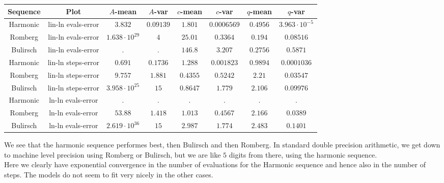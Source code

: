 \begin{table}[H]
    \centering
        \small
    \begin{tabular}{c|c||c|c|c|c|c	|c}
Sequence & Plot & \(A\)-mean & \(A\)-var & \(c\)-mean & \(c\)-var & \(q\)-mean & \(q\)-var\\\hline
Harmonic & lin-ln evals-error & \(3.832\) & \(0.09139\) & \(1.801\) & \(0.0006569\) & \(0.4956\) & \(3.963\cdot 10^{-5}\) \\
Romberg & lin-ln evals-error & \(1.638\cdot 10^{29}\) & \(4\) & \(25.01\) & \(0.3364\) & \(0.194\) & \(0.08516\) \\
Bulirsch & lin-ln evals-error & \(.\) & \(.\) & \(146.8\) & \(3.207\) & \(0.2756\) & \(0.5871\) \\
Harmonic & lin-ln steps-error & \(0.691\) & \(0.1736\) & \(1.288\) & \(0.001823\) & \(0.9894\) & \(0.0001036\) \\
Romberg & lin-ln steps-error & \(9.757\) & \(1.881\) & \(0.4355\) & \(0.5242\) & \(2.21\) & \(0.03547\) \\
Bulirsch & lin-ln steps-error & \(3.958\cdot 10^{25}\) & \(15\) & \(0.8647\) & \(1.779\) & \(2.106\) & \(0.09976\) \\
Harmonic & ln-ln evals-error & . & . & . & . & . & . \\
Romberg & ln-ln evals-error & \(53.88\) & \(1.418\) & \(1.013\) & \(0.4567\) & \(2.166\) & \(0.0389\) \\
Bulirsch & ln-ln evals-error & \(2.619\cdot 10^{36}\) & \(15\) & \(2.987\) & \(1.774\) & \(2.483\) & \(0.1401\) \\
    \end{tabular}
    \label{tab:my_label}
\end{table}

We see that the harmonic sequence performes best, then Bulirsch and then Romberg. In standard double precision arithmetic, we get down to machine level precision using Romberg or Bulirsch, but we are like \(5\) digits from there, using the harmonic sequence.\\

Here we clearly have exponential convergence in the number of evaluations for the Harmonic sequence and hence also in the number of steps. The models do not seem to fit very nicely in the other cases.\\

